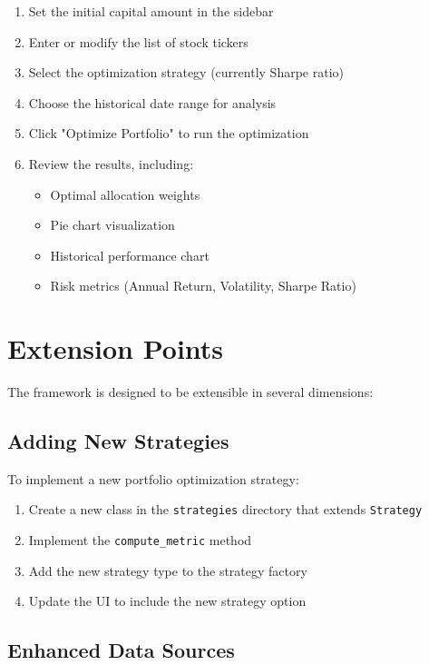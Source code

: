 \documentclass[11pt,a4paper]{article}
\begin{document}
\begin{enumerate}
    \item Set the initial capital amount in the sidebar
    \item Enter or modify the list of stock tickers
    \item Select the optimization strategy (currently Sharpe ratio)
    \item Choose the historical date range for analysis
    \item Click "Optimize Portfolio" to run the optimization
    \item Review the results, including:
    \begin{itemize}
        \item Optimal allocation weights
        \item Pie chart visualization
        \item Historical performance chart
        \item Risk metrics (Annual Return, Volatility, Sharpe Ratio)
    \end{itemize}
\end{enumerate}

\section{Extension Points}

The framework is designed to be extensible in several dimensions:

\subsection{Adding New Strategies}

To implement a new portfolio optimization strategy:

\begin{enumerate}
    \item Create a new class in the \texttt{strategies} directory that extends \texttt{Strategy}
    \item Implement the \texttt{compute\_metric} method
    \item Add the new strategy type to the strategy factory
    \item Update the UI to include the new strategy option
\end{enumerate}

\subsection{Enhanced Data Sources}
\end{document}
